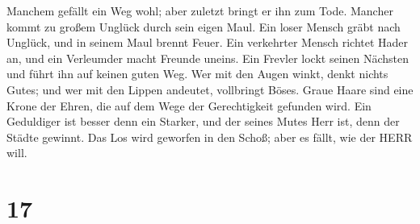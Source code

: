 Manchem gefällt ein Weg wohl; aber zuletzt bringt er ihn zum Tode.
 Mancher kommt zu großem Unglück durch sein eigen Maul.
 Ein loser Mensch gräbt nach Unglück, und in seinem Maul
brennt Feuer.  Ein verkehrter Mensch richtet Hader an, und
ein Verleumder macht Freunde uneins.  Ein Frevler lockt
seinen Nächsten und führt ihn auf keinen guten Weg.  Wer
mit den Augen winkt, denkt nichts Gutes; und wer mit den Lippen
andeutet, vollbringt Böses.  Graue Haare sind eine Krone
der Ehren, die auf dem Wege der Gerechtigkeit gefunden wird.
 Ein Geduldiger ist besser denn ein Starker, und der seines
Mutes Herr ist, denn der Städte gewinnt.  Das Los wird
geworfen in den Schoß; aber es fällt, wie der HERR will.

\hypertarget{section-16}{%
\section{17}\label{section-16}}

